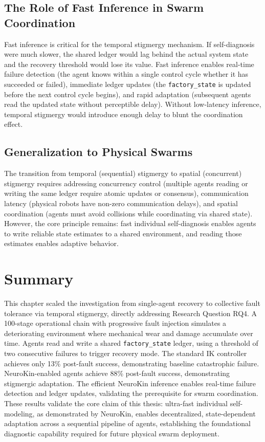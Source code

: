 \documentclass[12pt,a4paper,oneside]{report}
\begin{document}
\subsection{The Role of Fast Inference in Swarm Coordination}

Fast inference is critical for the temporal stigmergy mechanism. If self-diagnosis were much slower, the shared ledger would lag behind the actual system state and the recovery threshold would lose its value. Fast inference enables real-time failure detection (the agent knows within a single control cycle whether it has succeeded or failed), immediate ledger updates (the \texttt{factory\_state} is updated before the next control cycle begins), and rapid adaptation (subsequent agents read the updated state without perceptible delay). Without low-latency inference, temporal stigmergy would introduce enough delay to blunt the coordination effect.

\subsection{Generalization to Physical Swarms}

The transition from temporal (sequential) stigmergy to spatial (concurrent) stigmergy requires addressing concurrency control (multiple agents reading or writing the same ledger require atomic updates or consensus), communication latency (physical robots have non-zero communication delays), and spatial coordination (agents must avoid collisions while coordinating via shared state). However, the core principle remains: fast individual self-diagnosis enables agents to write reliable state estimates to a shared environment, and reading those estimates enables adaptive behavior.

\section{Summary}

This chapter scaled the investigation from single-agent recovery to collective fault tolerance via temporal stigmergy, directly addressing Research Question RQ4. A 100-stage operational chain with progressive fault injection simulates a deteriorating environment where mechanical wear and damage accumulate over time. Agents read and write a shared \texttt{factory\_state} ledger, using a threshold of two consecutive failures to trigger recovery mode. The standard IK controller achieves only 13\% post-fault success, demonstrating baseline catastrophic failure. NeuroKin-enabled agents achieve 88\% post-fault success, demonstrating stigmergic adaptation. The efficient NeuroKin inference enables real-time failure detection and ledger updates, validating the prerequisite for swarm coordination. These results validate the core claim of this thesis: ultra-fast individual self-modeling, as demonstrated by NeuroKin, enables decentralized, state-dependent adaptation across a sequential pipeline of agents, establishing the foundational diagnostic capability required for future physical swarm deployment.
\end{document}
